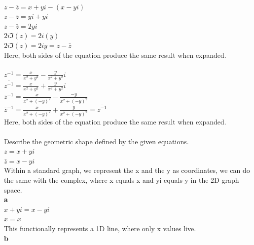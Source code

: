 \documentclass[12pt]{article}
\begin{document}
\\

$z - \bar{z} = x + yi - (x - yi)$\\
$z - \bar{z} = yi + yi$\\
$z - \bar{z} = 2yi$\\

$ 2i\Im(z) = 2i(y)$\\

$ 2i\Im(z) = 2iy = z - \bar{z}$\\

Here, both sides of the equation produce the same result when expanded.\\

\\

$z^{-1} = \frac{x}{x^2+y^2} - \frac{y}{x^2+y^2}i$\\

$\overline{z^{-1}} = \frac{x}{x^2+y^2} + \frac{y}{x^2+y^2}i$\\
$\overline{z}^{-1} = \frac{x}{x^2 + (-y)^2} - \frac{-y}{x^2 + (-y)^2}$\\

$\overline{z}^{-1} = \frac{x}{x^2 + (-y)^2} + \frac{y}{x^2 + (-y)^2} = \overline{z^{-1}}$\\


Here, both sides of the equation produce the same result when expanded.\\

\\

Describe the geometric shape defined by the given equations.\\

$z = x + yi$\\
$\bar{z} = x - yi$\\

Within a standard graph, we represent the x and the y as coordinates, we can do the same with the complex, where x equals x and yi equals y in the 2D graph space.\\

{\bf a}\\

$x + yi = x - yi$\\
$x = x$\\

This functionally represents a 1D line, where only x values live.\\

{\bf b}\\
\end{document}
